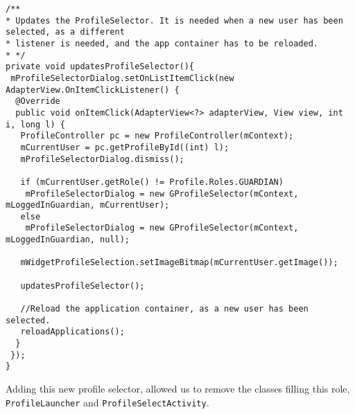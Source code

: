 \begin{lstlisting}[caption={The recursive method setting instantiating the Profile Selector with the correct arguments each time a new user is selected.}, label={lst:newprofileselectoronitemclick}]
/**
* Updates the ProfileSelector. It is needed when a new user has been selected, as a different
* listener is needed, and the app container has to be reloaded.
* */
private void updatesProfileSelector(){
 mProfileSelectorDialog.setOnListItemClick(new AdapterView.OnItemClickListener() {
  @Override
  public void onItemClick(AdapterView<?> adapterView, View view, int i, long l) {
   ProfileController pc = new ProfileController(mContext);
   mCurrentUser = pc.getProfileById((int) l);
   mProfileSelectorDialog.dismiss();
  
   if (mCurrentUser.getRole() != Profile.Roles.GUARDIAN)
    mProfileSelectorDialog = new GProfileSelector(mContext, mLoggedInGuardian, mCurrentUser);
   else
    mProfileSelectorDialog = new GProfileSelector(mContext, mLoggedInGuardian, null);
  
   mWidgetProfileSelection.setImageBitmap(mCurrentUser.getImage());
  
   updatesProfileSelector();
  
   //Reload the application container, as a new user has been selected.
   reloadApplications();
  }
 });
} 
\end{lstlisting}

Adding this new profile selector, allowed us to remove the \launcher classes filling this role, \lstinline!ProfileLauncher! and \lstinline!ProfileSelectActivity!.